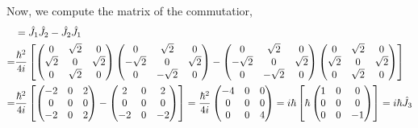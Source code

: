 \documentclass[12pt]{extarticle}
\begin{document}
Now, we compute the matrix of the commutatior,
\begin{align*}
[\J_1, \J_2] & = \J_1 \J_2 - \J_2 \J_1 \\ = & \frac{\hbar^2}{4i} 
\left[
\begin{pmatrix}
0 & \sqrt{2} & 0 \\
\sqrt{2} & 0 & \sqrt{2} \\
0 & \sqrt{2} & 0
\end{pmatrix}
\begin{pmatrix}
0 & \sqrt{2} & 0 \\
-\sqrt{2} & 0 & \sqrt{2} \\
0 & -\sqrt{2} & 0
\end{pmatrix}
-
\begin{pmatrix}
0 & \sqrt{2} & 0 \\
-\sqrt{2} & 0 & \sqrt{2} \\
0 & -\sqrt{2} & 0
\end{pmatrix}
\begin{pmatrix}
0 & \sqrt{2} & 0 \\
\sqrt{2} & 0 & \sqrt{2} \\
0 & \sqrt{2} & 0
\end{pmatrix} 
\right]
\\ = & \frac{\hbar^2}{4i} 
\left[
\begin{pmatrix}
-2 & 0 & 2 \\
0 & 0 & 0 \\
-2 & 0 & 2
\end{pmatrix}
-
\begin{pmatrix}
2 & 0 & 2 \\
0 & 0 & 0 \\
-2 & 0 & -2
\end{pmatrix} 
\right]
= 
\frac{\hbar^2}{4i} 
\begin{pmatrix}
-4 & 0 & 0 \\
0 & 0 & 0 \\
0 & 0 & 4
\end{pmatrix}
=
i \hbar \left[ \hbar
\begin{pmatrix}
1 & 0 & 0 \\
0 & 0 & 0 \\
0 & 0 & -1
\end{pmatrix} \right]
= i \hbar \J_3
\end{align*}
\end{document}
